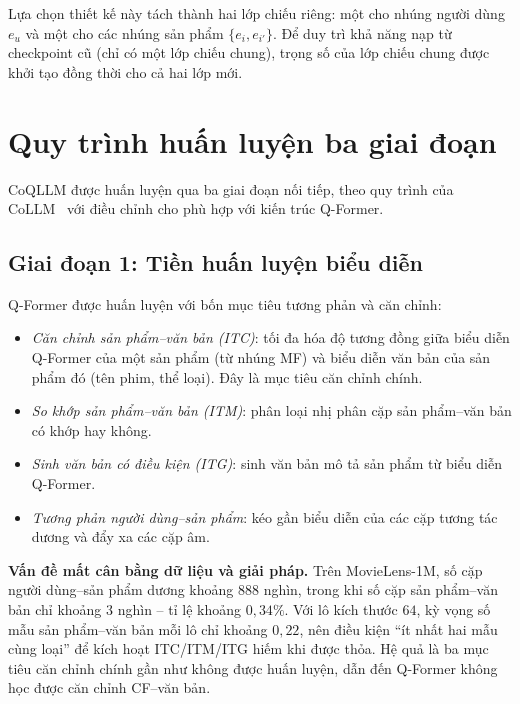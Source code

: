 Lựa chọn thiết kế này tách thành hai lớp chiếu riêng: một cho nhúng người dùng $e_u$
và một cho các nhúng sản phẩm $\{e_i, e_{i'}\}$. Để duy trì khả năng nạp từ checkpoint
cũ (chỉ có một lớp chiếu chung), trọng số của lớp chiếu chung được khởi tạo đồng thời
cho cả hai lớp mới.

\section{Quy trình huấn luyện ba giai đoạn}
\label{sec:ba-giai-doan}

CoQLLM được huấn luyện qua ba giai đoạn nối tiếp, theo quy trình của CoLLM~\cite{collm2023}
với điều chỉnh cho phù hợp với kiến trúc Q-Former.

\subsection{Giai đoạn 1: Tiền huấn luyện biểu diễn}
\label{ssec:stage1}

Q-Former được huấn luyện với bốn mục tiêu tương phản và căn chỉnh:

\begin{itemize}
    \item \textit{Căn chỉnh sản phẩm--văn bản (ITC)}: tối đa hóa độ tương đồng giữa biểu
    diễn Q-Former của một sản phẩm (từ nhúng MF) và biểu diễn văn bản của sản phẩm đó
    (tên phim, thể loại). Đây là mục tiêu căn chỉnh chính.

    \item \textit{So khớp sản phẩm--văn bản (ITM)}: phân loại nhị phân cặp
    sản phẩm--văn bản có khớp hay không.

    \item \textit{Sinh văn bản có điều kiện (ITG)}: sinh văn bản mô tả sản phẩm từ biểu
    diễn Q-Former.

    \item \textit{Tương phản người dùng--sản phẩm}: kéo gần biểu diễn của các cặp tương
    tác dương và đẩy xa các cặp âm.
\end{itemize}

\textbf{Vấn đề mất cân bằng dữ liệu và giải pháp.} Trên MovieLens-1M, số cặp người
dùng--sản phẩm dương khoảng $888$ nghìn, trong khi số cặp sản phẩm--văn bản chỉ khoảng
$3$ nghìn -- tỉ lệ khoảng $0{,}34\%$. Với lô kích thước $64$, kỳ vọng số mẫu
sản phẩm--văn bản mỗi lô chỉ khoảng $0{,}22$, nên điều kiện ``ít nhất hai mẫu cùng loại''
để kích hoạt ITC/ITM/ITG hiếm khi được thỏa. Hệ quả là ba mục tiêu căn chỉnh chính gần
như không được huấn luyện, dẫn đến Q-Former không học được căn chỉnh CF--văn bản.

